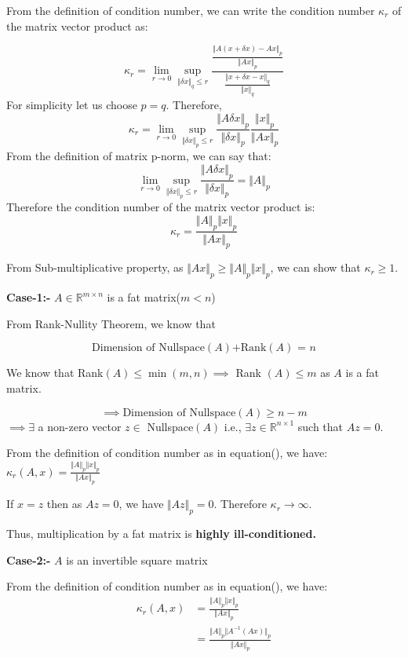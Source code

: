 \documentclass[
]{book}
\begin{document}
From the definition of condition number, we can write the condition number \(\kappa_r\) of the matrix vector product as:

\[\kappa_r = \lim_{r\to 0} \sup_{\Vert \delta x \Vert_q\le r} \dfrac{\frac{\Vert A(x+\delta x)-Ax \Vert_p}{\Vert Ax \Vert_p}}{\frac{\Vert x+\delta x-x\Vert_q}{\Vert x\Vert_q}}\]
For simplicity let us choose \(p=q\). Therefore,
\[\kappa_r = \lim_{r\to 0} \sup_{\Vert \delta x \Vert_p\le r} \frac{\Vert A\delta x \Vert_p}{\Vert \delta x \Vert_p} \frac{\Vert x \Vert_p}{\Vert Ax\Vert_p}\]
From the definition of matrix p-norm, we can say that: \[\lim_{r\to 0} \sup_{\Vert \delta x \Vert_p\le r} \frac{\Vert A\delta x \Vert_p}{\Vert \delta x \Vert_p} = \Vert A\Vert_p\]
Therefore the condition number of the matrix vector product is:
\begin{equation}
\kappa_r =  \frac{\Vert A \Vert_p \Vert x \Vert_p}{\Vert Ax\Vert_p}
\end{equation}

From Sub-multiplicative property, as \(\Vert Ax\Vert_p \ge\Vert A \Vert_p \Vert x \Vert_p\), we can show that \(\kappa_r\ge 1\).

\textbf{Case-1:-} \(A\in \mathbb{R}^{m\times n}\) is a fat matrix(\(m<n\))

From Rank-Nullity Theorem, we know that

\[\text{Dimension of Nullspace$(A)$+Rank$(A)$ = $n$}\]

We know that Rank\((A) \le \min(m,n) \implies\) Rank \((A) \le m\) as \(A\) is a fat matrix.

\[\implies \text{Dimension of Nullspace}(A) \ge n-m\]
\(\implies \exists\) a non-zero vector \(z \in\) Nullspace\((A)\) i.e., \(\exists z\in \mathbb{R}^{n\times 1}\) such that \(Az=0\).

From the definition of condition number as in equation(), we have:
\(\kappa_r(A,x) = \frac{\Vert A \Vert_p \Vert x \Vert_p}{\Vert Ax\Vert_p}\)

If \(x=z\) then as \(Az=0\), we have \(\Vert Az\Vert_p = 0\). Therefore \(\kappa_r \to \infty\).

Thus, multiplication by a fat matrix is \textbf{highly ill-conditioned.}

\textbf{Case-2:-} \(A\) is an invertible square matrix

From the definition of condition number as in equation(), we have:
\begin{align}
\kappa_r(A,x) &=  \frac{\Vert A \Vert_p \Vert x \Vert_p}{\Vert Ax\Vert_p}\\
 &= \frac{\Vert A \Vert_p \Vert A^{-1}(Ax) \Vert_p}{\Vert Ax\Vert_p}\\
\end{align}
\end{document}
